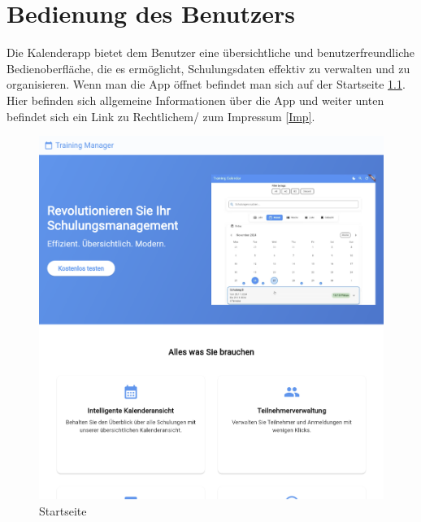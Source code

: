 \chapter{Bedienung des Benutzers}

Die Kalenderapp bietet dem Benutzer eine übersichtliche und benutzerfreundliche Bedienoberfläche, die es ermöglicht, Schulungsdaten effektiv zu verwalten und zu organisieren. 
Wenn man die App öffnet befindet man sich auf der Startseite \ref{Home}.  Hier befinden sich allgemeine Informationen über die App und weiter unten befindet sich ein Link zu Rechtlichem/ zum Impressum \ref{Imp}.
\begin{figure}[htbp!]
        \centering
        \includegraphics[scale=0.2]{img/flutter_31.png}
        \caption{Startseite}
        \label{Home}
    \end{figure}

